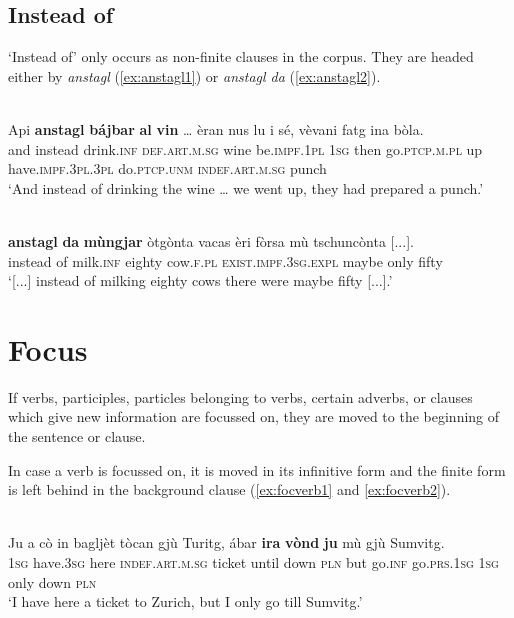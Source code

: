 \subsection{Instead of}
`Instead of' only occurs as non-finite clauses in the corpus. They are headed either by \textit{anstagl} (\ref{ex:anstagl1}) or \textit{anstagl da} (\ref{ex:anstagl2}).

\ea
\label{ex:anstagl1}
\\
\gll    Api \textbf{anstagl} \textbf{bájbar} \textbf{al} \textbf{vin} … èran nus lu i sé, vèvani fatg ina bòla.\\
and instead drink.\textsc{inf} \textsc{def.art.m.sg} wine {} be.\textsc{impf.1pl} \textsc{1sg} then go.\textsc{ptcp.m.pl} up have.\textsc{impf.3pl.3pl} do.\textsc{ptcp.unm} \textsc{indef.art.m.sg} punch \\
\glt `And instead of drinking the wine … we went up, they had prepared a punch.'
\z


\ea
\label{ex:anstagl2}
\\
	\gll [...] \textbf{anstagl} \textbf{da} \textbf{mùngjar} òtgònta vacas èri fòrsa mù tschuncònta [...].\\
 {} instead of milk.\textsc{inf} eighty cow.\textsc{f.pl} \textsc{exist.impf.3sg.expl} maybe only fifty\\
\glt `[...]  instead of milking eighty cows there were maybe fifty [...].'
\z



\section{Focus}
If verbs, participles, particles belonging to verbs, certain adverbs, or clauses which give new information are focussed on, they are moved to the beginning of the sentence or clause.

In case a verb is focussed on, it is moved in its infinitive form and the finite form is left behind in the background clause (\ref{ex:focverb1} and \ref{ex:focverb2}).

\ea
\label{ex:focverb1}
\\
\gll  Ju a cò in bagljèt tòcan gjù Turitg, ábar \textbf{ira} \textbf{vònd} \textbf{ju} mù gjù Sumvitg.\\
\textsc{1sg} have.\textsc{3sg} here \textsc{indef.art.m.sg} ticket until down \textsc{pln} but go.\textsc{inf} go.\textsc{prs}.\textsc{1sg} \textsc{1sg} only down \textsc{pln}\\
\glt `I have here a ticket to Zurich, but I only go till Sumvitg.'
\z

